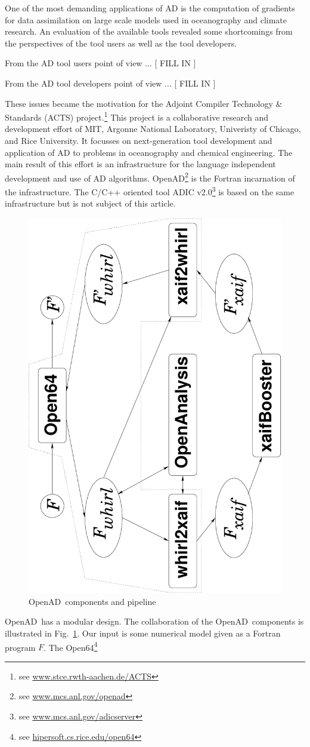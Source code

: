 \documentclass[11pt]{article}
\newcommand{\OpenAD}{OpenAD}
\newcommand{\OpenSixtyFour}{Open64}
\newcommand{\reffig}[1]{{Fig.~\ref{#1}}}
\begin{document}
One of the most demanding applications of AD is the computation of gradients for 
data assimilation on large scale models used in oceanography and climate research. 
An evaluation of the available tools revealed some shortcomings from the perspectives 
of the tool users as well as the tool developers. 

From  the AD tool  users point of view ... 
{\color{red} [ FILL IN ] } 

From the AD tool developers point of view ...
{\color{red} [ FILL IN ] } 

These issues became the motivation for the 
Adjoint Compiler Technology \& Standards (ACTS) project.\footnote{ 
see \url{www.stce.rwth-aachen.de/ACTS}
} 
This project is a collaborative
research and development effort of MIT, Argonne National Laboratory, 
Univeristy of Chicago, and Rice University. 
It focusses on  next-generation tool development and 
application of AD to problems in oceanography and chemical engineering.
The main result of this effort is an infrastructure for the language independent 
development and use of AD algorithms. 
\OpenAD\footnote { 
see \url{www.mcs.anl.gov/openad} 
}
is the Fortran incarnation of the infrastructure.
The C/C++ oriented tool ADIC v2.0\footnote{
see \url{www.mcs.anl.gov/adicserver}
} 
is based on the same infrastructure but is 
not subject of this article.
\begin{figure}
\centering\includegraphics[width=.4\textwidth]{overview}
\caption{\OpenAD\ components and pipeline} \label{fig:overview}
\end{figure}
\OpenAD\ has  a modular design. 
The collaboration  of the \OpenAD\ components is illustrated in 
\reffig{fig:overview}.
Our input is some numerical model given as a Fortran program 
$F$.
The \OpenSixtyFour\footnote{
see \url{hipersoft.cs.rice.edu/open64}
}
\end{document}
